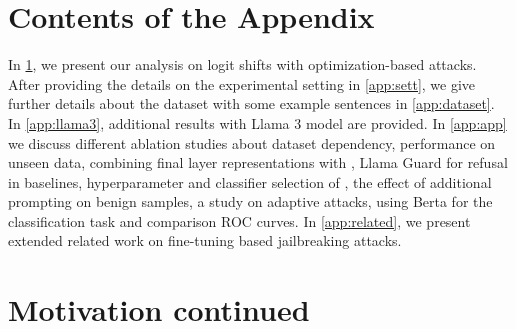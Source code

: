 \section*{Contents of the Appendix}
\label{app}    
In \cref{app:motivation}, we present our analysis on logit shifts with optimization-based attacks. After providing the details on the experimental setting in \cref{app:sett}, we give further details about the dataset with some example sentences in \cref{app:dataset}. In \cref{app:llama3}, additional results with Llama 3 model are provided. In \cref{app:app} we discuss different ablation studies about dataset dependency, performance on unseen data, combining final layer representations with \methodname{}, Llama Guard for refusal in baselines, hyperparameter and classifier selection of \methodname{}, the effect of additional prompting on benign samples, a study on adaptive attacks, using Berta for the classification task and comparison ROC curves. In \cref{app:related}, we present extended related work on fine-tuning based jailbreaking attacks.
\section{Motivation continued}
\label{app:motivation}

